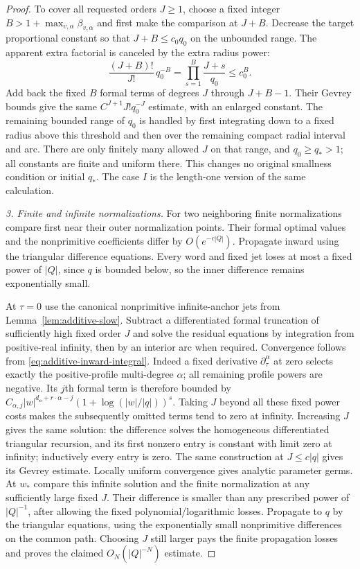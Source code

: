 \begin{proof}
To cover all requested orders $J\ge1$, choose a fixed integer
$B>1+\max_{v,\alpha}\beta_{v,\alpha}$ and first make the comparison
at $J+B$.  Decrease the target proportional constant so that
$J+B\le c_0q_0$ on the unbounded range.  The apparent extra factorial
is canceled by the extra radius power:
\begin{equation}\label{eq:additive-fixed-J-shift}
 \frac{(J+B)!}{J!}\,q_0^{-B}
       =\prod_{s=1}^{B}\frac{J+s}{q_0}\le c_0^B.
\end{equation}
Add back the fixed $B$ formal terms of degrees $J$ through $J+B-1$.
Their Gevrey bounds give the same $C^{J+1}J!q_0^{-J}$ estimate, with
an enlarged constant.  The remaining bounded range of $q_0$ is handled
by first integrating down to a fixed radius above this threshold and
then over the remaining compact radial interval and arc.  There are
only finitely many allowed $J$ on that range, and $q_0\ge q_*>1$;
all constants are finite and uniform there.  This changes no original
smallness condition or initial $q_*$.  The case $I$ is the length-one
version of the same calculation.

\emph{3. Finite and infinite normalizations.}
For two neighboring finite normalizations compare first near their
outer normalization points.  Their formal optimal values and the
nonprimitive coefficients differ by $O(e^{-c|Q|})$.
Propagate inward using the triangular difference equations.  Every
word and fixed jet loses at most a fixed power of $|Q|$, since $q$ is
bounded below, so the inner difference remains exponentially small.

At $\tau=0$ use the canonical nonprimitive infinite-anchor jets from
Lemma~\ref{lem:additive-slow}.  Subtract a differentiated formal
truncation of sufficiently high fixed order $J$ and solve the residual
equations by integration from positive-real infinity, then by an
interior arc when required.  Convergence follows from
\eqref{eq:additive-inward-integral}.  Indeed a fixed derivative
$\partial_\tau^\alpha$ at zero selects exactly the positive-profile
multi-degree $\alpha$; all remaining profile powers are negative.
Its $j$th formal term is therefore bounded by
$C_{\alpha,j}|w|^{d_{\mathbf e}+r\cdot\alpha-j}
(1+\log(|w|/|q|))^s$.  Taking $J$ beyond all these fixed power costs
makes the subsequently omitted terms tend to zero at infinity.
Increasing $J$ gives the same
solution: the difference solves the homogeneous differentiated
triangular recursion, and its first nonzero entry is constant with
limit zero at infinity; inductively every entry is zero.  The same
construction at $J\le c|q|$ gives its Gevrey estimate.  Locally uniform
convergence gives analytic parameter germs.  At $w_*$ compare this
infinite solution and the finite normalization at any sufficiently
large fixed $J$.  Their difference is smaller than any prescribed
power of $|Q|^{-1}$, after allowing the fixed polynomial/logarithmic
losses.  Propagate to $q$ by the triangular equations, using the
exponentially small nonprimitive differences on the common path.
Choosing $J$ still larger pays the finite propagation losses and proves
the claimed $O_N(|Q|^{-N})$ estimate.
\end{proof}

